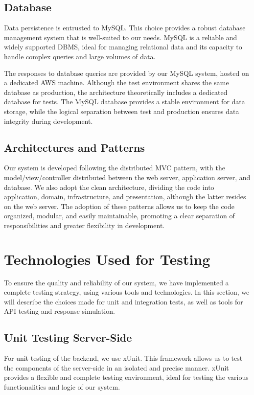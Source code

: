 \subsection{Database}
Data persistence is entrusted to MySQL. This choice provides a robust database management 
system that is well-suited to our needs.
MySQL is a reliable and widely supported DBMS, ideal for managing relational data and its 
capacity to handle complex queries and large volumes of data.

The responses to database queries are provided by our MySQL system, hosted on a dedicated 
AWS machine. Although the test environment shares the same database as production, 
the architecture theoretically includes a dedicated database for tests.
The MySQL database provides a stable environment for data storage, while the logical separation 
between test and production ensures data integrity during development.

\subsection{Architectures and Patterns}
Our system is developed following the distributed MVC pattern, with the model/view/controller 
distributed between the web server, application server, and database. We also adopt the clean 
architecture, dividing the code into application, domain, infrastructure, and presentation, although the latter resides on the web server.
The adoption of these patterns allows us to keep the code organized, modular, and easily 
maintainable, promoting a clear separation of responsibilities and greater flexibility in development.

\section{Technologies Used for Testing}
To ensure the quality and reliability of our system, we have implemented a complete testing 
strategy, using various tools and technologies. In this section, we will describe the choices 
made for unit and integration tests, as well as tools for API testing and response simulation.

\subsection{Unit Testing Server-Side}
For unit testing of the backend, we use xUnit. This framework allows us to test the 
components of the server-side in an isolated and precise manner.
xUnit provides a flexible and complete testing environment, ideal for testing the various 
functionalities and logic of our system.

